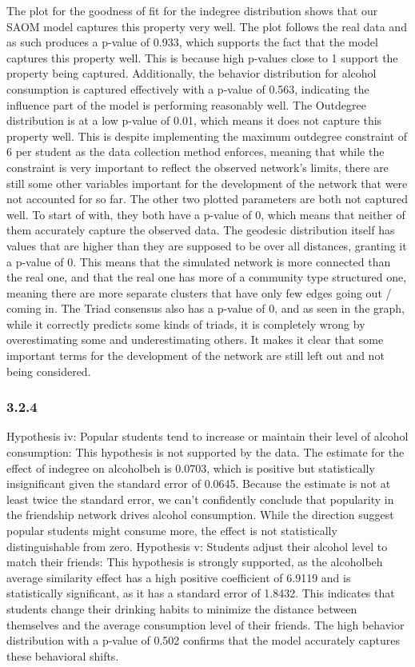 \documentclass[
]{article}
\begin{document}
The plot for the goodness of fit for the indegree distribution shows
that our SAOM model captures this property very well. The plot follows
the real data and as such produces a p-value of 0.933, which supports
the fact that the model captures this property well. This is because
high p-values close to 1 support the property being captured.
Additionally, the behavior distribution for alcohol consumption is
captured effectively with a p-value of 0.563, indicating the influence
part of the model is performing reasonably well. The Outdegree
distribution is at a low p-value of 0.01, which means it does not
capture this property well. This is despite implementing the maximum
outdegree constraint of 6 per student as the data collection method
enforces, meaning that while the constraint is very important to reflect
the observed network's limits, there are still some other variables
important for the development of the network that were not accounted for
so far. The other two plotted parameters are both not captured well. To
start of with, they both have a p-value of 0, which means that neither
of them accurately capture the observed data. The geodesic distribution
itself has values that are higher than they are supposed to be over all
distances, granting it a p-value of 0. This means that the simulated
network is more connected than the real one, and that the real one has
more of a community type structured one, meaning there are more separate
clusters that have only few edges going out / coming in. The Triad
consensus also has a p-value of 0, and as seen in the graph, while it
correctly predicts some kinds of triads, it is completely wrong by
overestimating some and underestimating others. It makes it clear that
some important terms for the development of the network are still left
out and not being considered.

\subsubsection{3.2.4}\label{section-19}

Hypothesis iv: Popular students tend to increase or maintain their level
of alcohol consumption: This hypothesis is not supported by the data.
The estimate for the effect of indegree on alcoholbeh is 0.0703, which
is positive but statistically insignificant given the standard error of
0.0645. Because the estimate is not at least twice the standard error,
we can't confidently conclude that popularity in the friendship network
drives alcohol consumption. While the direction suggest popular students
might consume more, the effect is not statistically distinguishable from
zero. Hypothesis v: Students adjust their alcohol level to match their
friends: This hypothesis is strongly supported, as the alcoholbeh
average similarity effect has a high positive coefficient of 6.9119 and
is statistically significant, as it has a standard error of 1.8432. This
indicates that students change their drinking habits to minimize the
distance between themselves and the average consumption level of their
friends. The high behavior distribution with a p-value of 0.502 confirms
that the model accurately captures these behavioral shifts.
\end{document}
